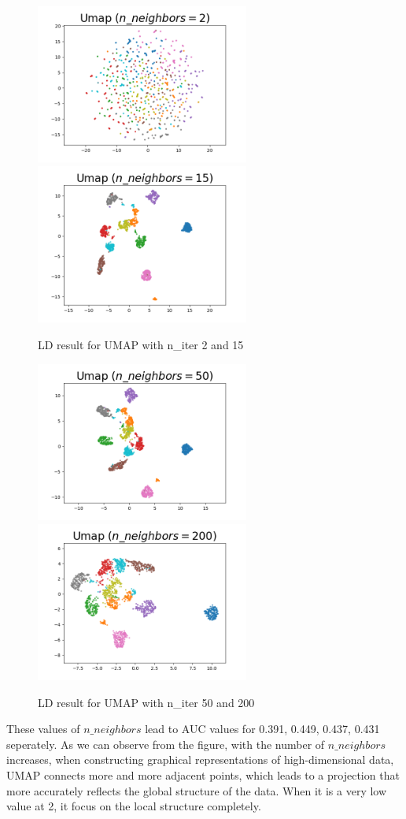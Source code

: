 \begin{figure}[H]
\centering  %
{
\label{Fig.sub.1}
\includegraphics[width=7cm,height=3.5cm\textwidth]{images/umap/umap_digit_n_neighbor_2.png}}
{
\label{Fig.sub.2}
\includegraphics[width=7cm,height=3.5cm\textwidth]{images/umap/umap_digit_n_neighbor_15.png}}
\caption{LD result for UMAP with n\_iter 2 and 15}
\end{figure}

\begin{figure}[H]
\centering  %
{
\label{Fig.sub.1}
\includegraphics[width=7cm,height=3.5cm\textwidth]{images/umap/umap_digit_n_neighbor_50.png}}
{
\label{Fig.sub.2}
\includegraphics[width=7cm,height=3.5cm\textwidth]{images/umap/umap_digit_n_neighbor_200.png}}
\caption{LD result for UMAP with n\_iter 50 and 200}
\end{figure}

\noindent These values of $n\_neighbors$ lead to AUC values for 0.391, 0.449, 0.437, 0.431 seperately. As we can observe from the figure, with the number of $n\_neighbors$ increases, when constructing graphical representations of high-dimensional data, UMAP connects more and more adjacent points, which leads to a projection that more accurately reflects the global structure of the data. When it is a very low value at 2, it focus on the local structure completely. \\

